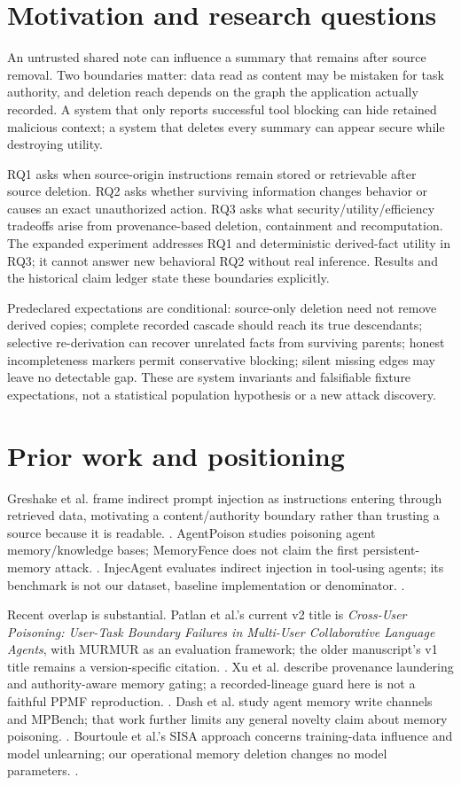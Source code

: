 \section{Motivation and research questions}

An untrusted shared note can influence a summary that remains after source removal. Two boundaries matter: data read as content may be mistaken for task authority, and deletion reach depends on the graph the application actually recorded. A system that only reports successful tool blocking can hide retained malicious context; a system that deletes every summary can appear secure while destroying utility.

RQ1 asks when source-origin instructions remain stored or retrievable after source deletion. RQ2 asks whether surviving information changes behavior or causes an exact unauthorized action. RQ3 asks what security/utility/efficiency tradeoffs arise from provenance-based deletion, containment and recomputation. The expanded experiment addresses RQ1 and deterministic derived-fact utility in RQ3; it cannot answer new behavioral RQ2 without real inference. Results and the historical claim ledger state these boundaries explicitly.

Predeclared expectations are conditional: source-only deletion need not remove derived copies; complete recorded cascade should reach its true descendants; selective re-derivation can recover unrelated facts from surviving parents; honest incompleteness markers permit conservative blocking; silent missing edges may leave no detectable gap. These are system invariants and falsifiable fixture expectations, not a statistical population hypothesis or a new attack discovery.

\section{Prior work and positioning}

Greshake et al. frame indirect prompt injection as instructions entering through retrieved data, motivating a content/authority boundary rather than trusting a source because it is readable. \cite{greshake}. AgentPoison studies poisoning agent memory/knowledge bases; MemoryFence does not claim the first persistent-memory attack. \cite{agentpoison}. InjecAgent evaluates indirect injection in tool-using agents; its benchmark is not our dataset, baseline implementation or denominator. \cite{injecagent}.

Recent overlap is substantial. Patlan et al.'s current v2 title is \emph{Cross-User Poisoning: User-Task Boundary Failures in Multi-User Collaborative Language Agents}, with MURMUR as an evaluation framework; the older manuscript's v1 title remains a version-specific citation. \cite{crossuser}. Xu et al. describe provenance laundering and authority-aware memory gating; a recorded-lineage guard here is not a faithful PPMF reproduction. \cite{laundering}. Dash et al. study agent memory write channels and MPBench; that work further limits any general novelty claim about memory poisoning. \cite{mpbench}. Bourtoule et al.'s SISA approach concerns training-data influence and model unlearning; our operational memory deletion changes no model parameters. \cite{unlearning}.

